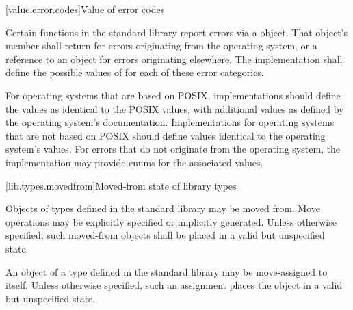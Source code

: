[value.error.codes]{Value of error codes}

\pnum
Certain functions in the \Cpp{} standard library report errors via a
 object. That object's
 member shall return  for
errors originating from the operating system, or a reference to an
  object for errors originating elsewhere.
The implementation shall define the possible values of  for each of these
error categories.
\begin{example}
For operating systems that are based on POSIX,
implementations should define the  values as
identical to the POSIX  values, with additional values as defined by the
operating system's documentation. Implementations for operating systems that are not
based on POSIX should define values identical to the operating system's
values. For errors that do not originate from the operating system, the implementation
may provide enums for the associated values.
\end{example}

[lib.types.movedfrom]{Moved-from state of library types}

\pnum
Objects of types defined in the \Cpp{} standard library may be moved
from. Move operations may be explicitly specified or
implicitly generated. Unless otherwise specified, such moved-from objects shall
be placed in a valid but unspecified state.

\pnum
An object of a type defined in the \Cpp{} standard library may be
move-assigned to itself.
Unless otherwise specified, such an assignment places the object in
a valid but unspecified state.
